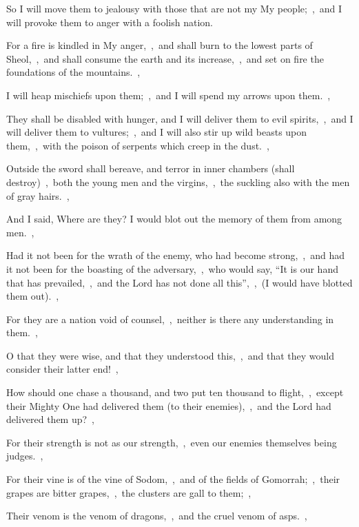 \documentclass[12pt,twoside,a5paper]{article}
\begin{document}
\begin{normalparskip}
   So I will move them to jealousy with those that are not my My people;~\sep\ and I will provoke them to anger with a foolish nation.


  For a fire is kindled in My anger,~\sep\ and shall burn to the lowest parts of Sheol,~\sep\ and shall consume the earth and its increase,~\sep\ and set on fire the foundations of the mountains.~\sep

  I will heap mischiefs upon them;~\sep\ and I will spend my arrows upon them.~\sep

  They shall be disabled with hunger, and I will deliver them to evil spirits,~\sep\ and I will deliver them to vultures;~\sep\ and I will also stir up wild beasts upon them,~\sep\ with the poison of serpents which creep in the dust.~\sep

  Outside the sword shall bereave, and terror in inner chambers (shall destroy)~\sep\ both the young men and the virgins,~\sep\ the suckling also with the men of gray hairs.~\sep

  And I said, Where are they? I would blot out the memory of them from among men.~\sep

  Had it not been for the wrath of the enemy, who had become strong,~\sep\ and had it not been for the boasting of the adversary,~\sep\ who would say, ``It is our hand that has prevailed,~\sep\ and the Lord has not done all this'',~\sep\ (I would have blotted them out).~\sep

  For they are a nation void of counsel,~\sep\ neither is there any understanding in them.~\sep

  O that they were wise, and that they understood this,~\sep\ and that they would consider their latter end!~\sep

  How should one chase a thousand, and two put ten thousand to flight,~\sep\ except their Mighty One had delivered them (to their enemies),~\sep\ and the Lord had delivered them up?~\sep

  For their strength is not as our strength,~\sep\ even our enemies themselves being judges.~\sep

  For their vine is of the vine of Sodom,~\sep\ and of the fields of Gomorrah;~\sep\ their grapes are bitter grapes,~\sep\ the clusters are gall to them;~\sep

  Their venom is the venom of dragons,~\sep\ and the cruel venom of asps.~\sep


\end{normalparskip}
\end{document}
